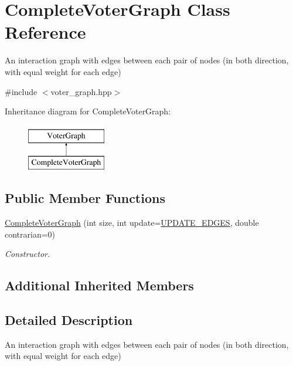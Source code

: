 \hypertarget{class_complete_voter_graph}{}\section{Complete\+Voter\+Graph Class Reference}
\label{class_complete_voter_graph}


An interaction graph with edges between each pair of nodes (in both direction, with equal weight for each edge)  




{\ttfamily \#include $<$voter\+\_\+graph.\+hpp$>$}

Inheritance diagram for Complete\+Voter\+Graph\+:\begin{figure}[H]
\begin{center}
\leavevmode
\includegraphics[height=2.000000cm]{class_complete_voter_graph}
\end{center}
\end{figure}
\subsection*{Public Member Functions}
\begin{DoxyCompactItemize}
\item 
\hyperlink{class_complete_voter_graph_a0adf42ee4826aa54e1a13d9b8d770554}{Complete\+Voter\+Graph} (int size, int update=\hyperlink{voter__graph_8hpp_ab3bec55c359e4ed771339c8bc61fc35aa01d100088352e1a7d3a34c9a66d0f951}{U\+P\+D\+A\+T\+E\+\_\+\+E\+D\+G\+E\+S}, double contrarian=0)
\begin{DoxyCompactList}\small\item\em Constructor. \end{DoxyCompactList}\end{DoxyCompactItemize}
\subsection*{Additional Inherited Members}


\subsection{Detailed Description}
An interaction graph with edges between each pair of nodes (in both direction, with equal weight for each edge) 

